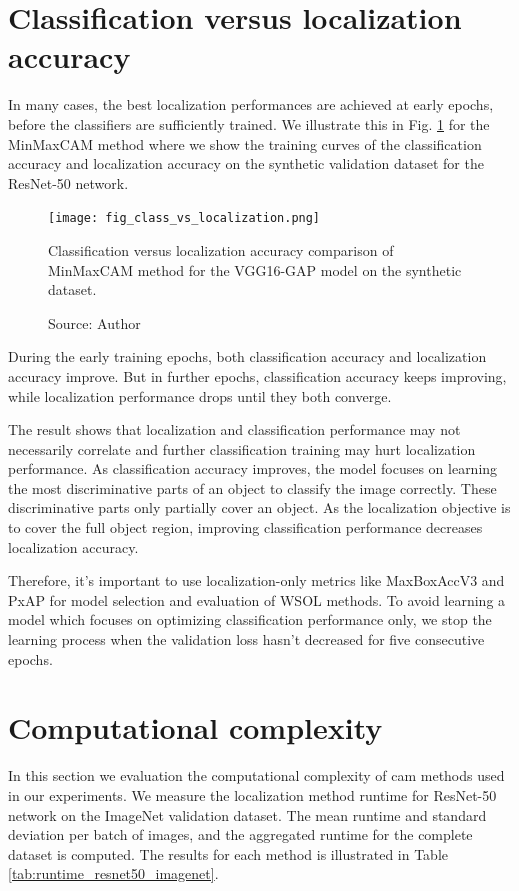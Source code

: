 \section{Classification versus localization accuracy}
In many cases, the best localization performances are achieved at early epochs, before the classifiers are sufficiently trained. We illustrate this in Fig. \ref{fig:classification_versus_localization} for the MinMaxCAM method where we show the training curves of the classification accuracy and localization accuracy on the synthetic validation dataset for the ResNet-50 network. 

\begin{figure}[ht]
    \begin{center}       
    \texttt{[image: fig\_class\_vs\_localization.png]}
    \caption[Classification versus localization accuracy]{Classification versus localization accuracy comparison of MinMaxCAM method for the VGG16-GAP model on the synthetic dataset.}
    \caption*{Source: Author}
    \label{fig:classification_versus_localization}
    \end{center}
\end{figure}

During the early training epochs, both classification accuracy and localization accuracy improve. But in further epochs, classification accuracy keeps improving, while localization performance drops until they both converge.

The result shows that localization and classification performance may not necessarily correlate and further classification training may hurt localization performance. As classification accuracy improves, the model focuses on learning the most discriminative parts of an object to classify the image correctly. These discriminative parts only partially cover an object. As the localization objective is to cover the full object region, improving classification performance decreases localization accuracy. 

Therefore, it's important to use localization-only metrics like MaxBoxAccV3 and PxAP for model selection and evaluation of WSOL methods. To avoid learning a model which focuses on optimizing classification performance only, we stop the learning process when the validation loss hasn't decreased for five consecutive epochs.

\section{Computational complexity}
In this section we evaluation the computational complexity of \acrshort{cam} methods used in our experiments. We measure the localization method runtime for ResNet-50 network on the ImageNet validation dataset. The mean runtime and standard deviation per batch of images, and the aggregated runtime for the complete  dataset is computed. The results for each method is illustrated in Table \ref{tab:runtime_resnet50_imagenet}.


